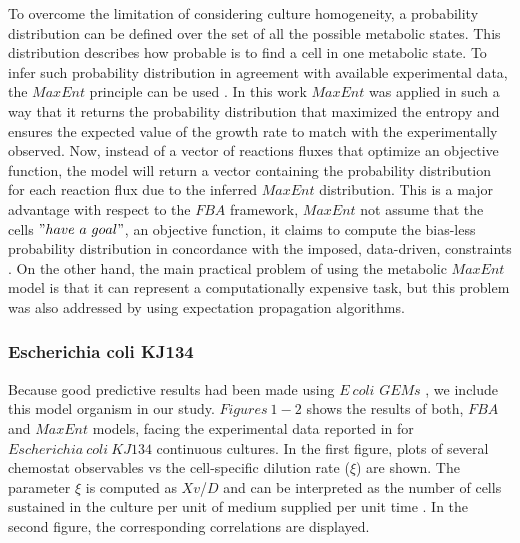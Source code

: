 \documentclass[]{article}
\begin{document}
	To overcome the limitation of considering culture homogeneity, a probability distribution can be defined over the set of all the possible metabolic states.
	This distribution describes how probable is to find a cell in one metabolic state.
	To infer such probability distribution in agreement with available experimental data, the $MaxEnt$ principle can be used  . 
	In this work $MaxEnt$ was applied in such a way that it returns the probability distribution that maximized the entropy and ensures the expected value of the growth rate to match with the experimentally observed.
	Now, instead of a vector of reactions fluxes that optimize an objective function, the model will return a vector containing the probability distribution for each reaction flux due to the inferred $MaxEnt$ distribution. 
	This is a major advantage with respect to the $FBA$ framework, $MaxEnt$ not assume that the cells $"have\ a\ goal"$, an objective function, it claims to compute the bias-less probability distribution in concordance with the imposed, data-driven, constraints . On the other hand, the main practical problem of using the metabolic $MaxEnt$ model is that it can represent a computationally expensive task, but this problem was also addressed by  using expectation propagation algorithms.
	
	
	
	\subsubsection{Escherichia coli KJ134}
	
	Because good predictive results had been made using $E\ coli$ $GEMs$ , we include this model organism in our study.
	$Figures\ 1-2$ shows the results of both, $FBA$ and $MaxEnt$ models, facing the experimental data reported in  for $Escherichia\ coli\ KJ134$ continuous cultures. 
	In the first figure, plots of several chemostat observables vs the cell-specific dilution rate ($\xi$) are shown. 
	The parameter $\xi$ is computed as $Xv$/$D$ and can be interpreted as the number of cells sustained in the culture per unit of medium supplied per unit time . 
	In the second figure, the corresponding correlations are displayed.
	
\end{document}
